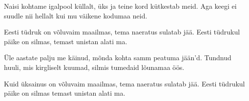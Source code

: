 Naisi kohtame igalpool k\"ullalt,
\"uks ja teine kord k\"utkestab meid.
Aga keegi ei suudle nii hellalt
kui mu v\"aikene kodumaa neid.

Eesti t\"udruk on v\~oluvaim maailmas,
tema naeratus sulatab j\"a\"a.
Eesti t\"udrukul p\"aike on silmas,
temast unistan alati ma.

\"Ule aastate palju me k\"ainud,
m\~onda kohta samm peatuma j\"a\"an'd.
Tundnud huuli, mis kirgliselt kuumad,
silmis tumedaid l\~ounamaa \"o\"os.

Kuid \"uksainus on v\~oluvaim maailmas,
tema naeratus sulatab j\"a\"a.
Eesti t\"udrukul p\"aike on silmas
temast unistan alati ma.